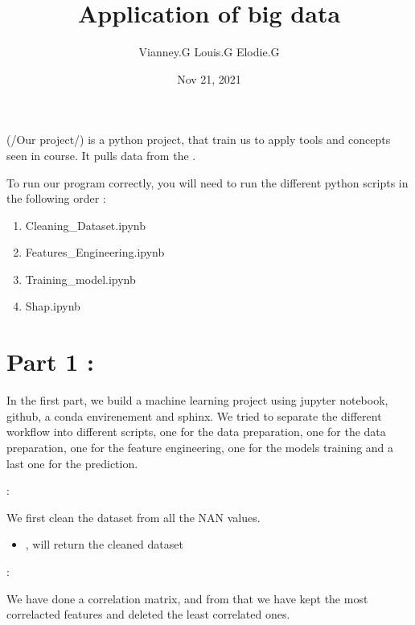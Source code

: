 \documentclass[letterpaper,10pt,english]{sphinxmanual}
\title{Application of big data}
\date{Nov 21, 2021}
\author{Vianney.G Louis.G Elodie.G}
\begin{document}
\pagestyle{empty}
\sphinxmaketitle
\pagestyle{plain}
\sphinxtableofcontents
\pagestyle{normal}
\label{\detokenize{index::doc}}


 (/Our project/) is a python project, that train us to
apply tools and concepts seen in course.  It pulls data from the
.

To run our program correctly, you will need to run the different python scripts in the following order :
\begin{enumerate}
%
\item {} 
Cleaning\_Dataset.ipynb

\item {} 
Features\_Engineering.ipynb

\item {} 
Training\_model.ipynb

\item {} 
Shap.ipynb

\end{enumerate}


\chapter{Part 1 :}
\label{\detokenize{index:part-1}}
In the first part, we build a machine learning project using jupyter notebook, github, a conda envirenement and sphinx.
We tried to separate the different workflow into different scripts, one for the data preparation,
one for the data preparation, one for the feature engineering, one for the models training and a
last one for the prediction.

 :

We first clean the dataset from all the NAN values.
\begin{itemize}
\item {} 
, will return the cleaned dataset

\end{itemize}

 :

We have done a correlation matrix, and from that we have kept the most correlacted features and deleted the least correlated ones.
\end{document}

